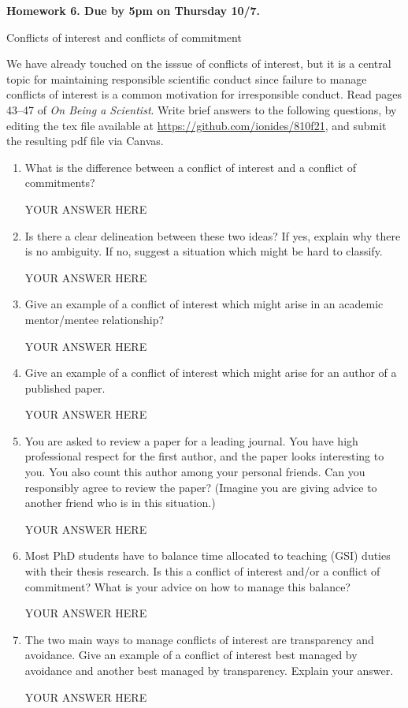 \documentclass[12pt]{article}
\begin{document}
\begin{center}\bf
Homework 6. Due by 5pm on Thursday 10/7.

Conflicts of interest and conflicts of commitment

\end{center}
We have already touched on the isssue of conflicts of interest, but it is a central topic for maintaining responsible scientific conduct since failure to manage conflicts of interest is a common motivation for irresponsible conduct. Read pages 43--47 of {\em On Being a Scientist}. Write brief answers to the following questions, by editing the tex file available at \url{https://github.com/ionides/810f21}, and submit the resulting pdf file via Canvas.

\begin{enumerate}

\item What is the difference between a conflict of interest and a conflict of commitments? 

YOUR ANSWER HERE

\item Is there a clear delineation between these two ideas? If yes, explain why there is no ambiguity. If no, suggest a situation which might be hard to classify.

YOUR ANSWER HERE

\item Give an example of a conflict of interest which might arise in an academic mentor/mentee relationship?

YOUR ANSWER HERE

\item Give an example of a conflict of interest which might arise for an author of a published paper.

YOUR ANSWER HERE

\item You are asked to review a paper for a leading journal. You have high professional respect for the first author, and the paper looks interesting to you. You also count this author among your personal friends. Can you responsibly agree to review the paper? (Imagine you are giving advice to another friend who is in this situation.)

YOUR ANSWER HERE

\item Most PhD students have to balance time allocated to teaching (GSI) duties with their thesis research. Is this a conflict of interest and/or a conflict of commitment? What is your advice on how to manage this balance?

YOUR ANSWER HERE

\item The two main ways to manage conflicts of interest are transparency and avoidance. Give an example of a conflict of interest best managed by avoidance and another best managed by transparency. Explain your answer.

YOUR ANSWER HERE

\end{enumerate}
\end{document}
